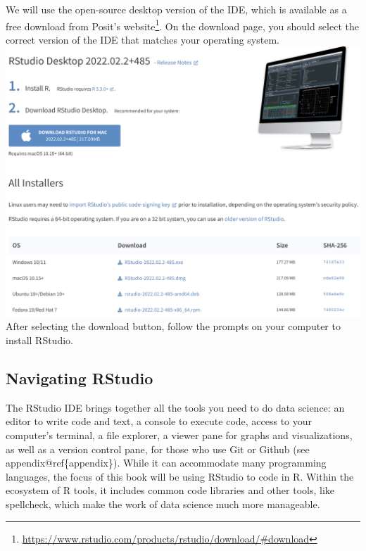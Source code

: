 \documentclass[
  krantz2]{krantz}
\begin{document}
We will use the open-source desktop version of the IDE, which is available as a free download from Posit's website\footnote{\url{https://www.rstudio.com/products/rstudio/download/\#download}}. On the download page, you should select the correct version of the IDE that matches your operating system.\\
\includegraphics{images/ide-download.png}
After selecting the download button, follow the prompts on your computer to install RStudio.

\hypertarget{navigate-ide}{%
\subsection{Navigating RStudio}\label{navigate-ide}}

The RStudio IDE brings together all the tools you need to do data science: an editor to write code and text, a console to execute code, access to your computer's terminal, a file explorer, a viewer pane for graphs and visualizations, as well as a version control pane, for those who use Git or Github (see appendix@ref\{appendix\}). While it can accommodate many programming languages, the focus of this book will be using RStudio to code in R. Within the ecosystem of R tools, it includes common code libraries and other tools, like spellcheck, which make the work of data science much more manageable.
\end{document}
